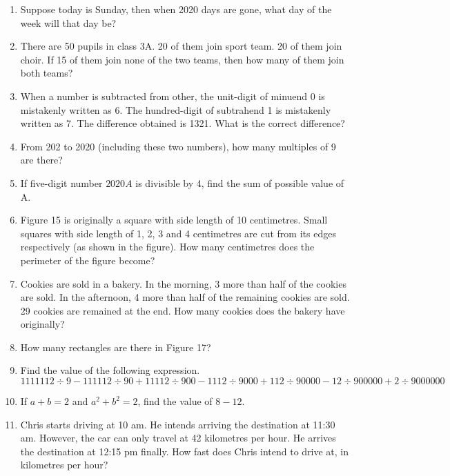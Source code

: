 \documentclass[11pt]{scrartcl}
\begin{document}
\begin{enumerate}
    \item Suppose today is Sunday, then when 2020 days are gone, what day of the week will that day be?
    
    \item There are 50 pupils in class 3A. 20 of them join sport team. 20 of them join choir. If 15 of them join none of the two teams, then how many of them join both teams?
    
    \item When a number is subtracted from other, the unit-digit of minuend 0 is mistakenly written as 6. The hundred-digit of subtrahend 1 is mistakenly written as 7. The difference obtained is 1321. What is the correct difference?
    
    \item From 202 to 2020 (including these two numbers), how many multiples of 9 are there?
    
    \item If five-digit number $2020A$ is divisible by 4, find the sum of possible value of A.
    
    \item Figure 15 is originally a square with side length of 10 centimetres. Small squares with side length of 1, 2, 3 and 4 centimetres are cut from its edges respectively (as shown in the figure). How many centimetres does the perimeter of the figure become?
    
    \item Cookies are sold in a bakery. In the morning, 3 more than half of the cookies are sold. In the afternoon, 4 more than half of the remaining cookies are sold. 29 cookies are remained at the end. How many cookies does the bakery have originally?
    
    \item How many rectangles are there in Figure 17?
    
    \item Find the value of the following expression.
    \[1111112 \div 9 - 111112 \div 90 + 11112 \div 900 - 1112 \div 9000 + 112 \div 90000 - 12 \div 900000 + 2 \div 9000000\]
    
    \item If $a + b = 2$ and $a^2 + b^2 = 2$, find the value of $8 - 12$.
    
    \item Chris starts driving at 10 am. He intends arriving the destination at 11:30 am. However, the car can only travel at 42 kilometres per hour. He arrives the destination at 12:15 pm finally. How fast does Chris intend to drive at, in kilometres per hour?
\end{enumerate}
\end{document}
